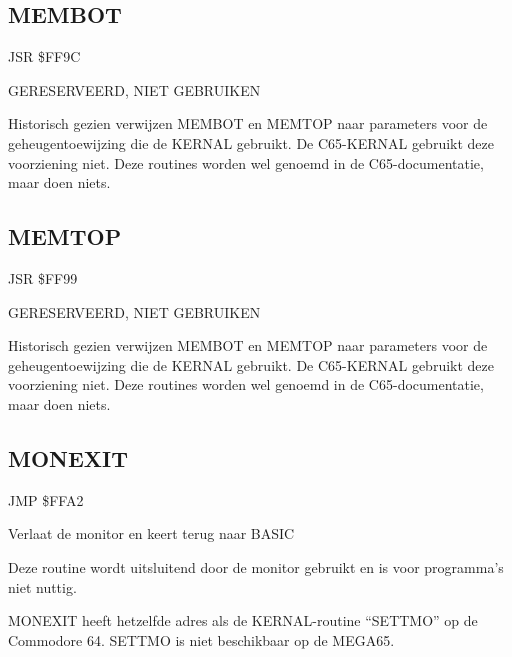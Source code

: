 \subsection{MEMBOT}
\label{KERNAL Jump Table!MEMBOT}
\begin{description}[leftmargin=2cm,style=nextline]
    \item [Adres:] JSR \$FF9C    \item [Omschrijving:] GERESERVEERD, NIET GEBRUIKEN    \item [Opmerkingen:]        Historisch gezien verwijzen MEMBOT en MEMTOP naar parameters voor de geheugentoewijzing die de KERNAL gebruikt. De C65-KERNAL gebruikt deze voorziening niet. Deze routines worden wel genoemd in de C65-documentatie, maar doen niets.
\end{description}



\newpage
\subsection{MEMTOP}
\label{KERNAL Jump Table!MEMTOP}
\begin{description}[leftmargin=2cm,style=nextline]
    \item [Adres:] JSR \$FF99    \item [Omschrijving:] GERESERVEERD, NIET GEBRUIKEN    \item [Opmerkingen:]        Historisch gezien verwijzen MEMBOT en MEMTOP naar parameters voor de geheugentoewijzing die de KERNAL gebruikt. De C65-KERNAL gebruikt deze voorziening niet. Deze routines worden wel genoemd in de C65-documentatie, maar doen niets.
\end{description}



\newpage
\subsection{MONEXIT}
\label{KERNAL Jump Table!MONEXIT}
\begin{description}[leftmargin=2cm,style=nextline]
    \item [Adres:] JMP \$FFA2    \item [Omschrijving:] Verlaat de monitor en keert terug naar BASIC    \item [Opmerkingen:]        Deze routine wordt uitsluitend door de monitor gebruikt en is voor programma's niet nuttig.

        MONEXIT heeft hetzelfde adres als de KERNAL-routine ``SETTMO'' op de Commodore 64. SETTMO is niet beschikbaar op de MEGA65.    \item [Voorbeeld:]

\end{description}


